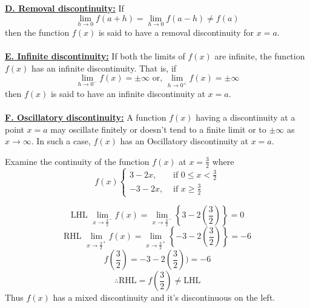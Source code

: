 \underline{\textbf{D. Removal discontinuity:}}
If \[
    \lim_{h \to 0} f(a+h) = \lim_{h \to 0} f(a-h) \neq f(a)
\] then the function $f(x)$ is said to have a removal discontinuity for $x=a$. \\~\\

\underline{\textbf{E. Infinite discontinuity:}}
If both the limits of $f(x)$ are infinite, the function $f(x)$ has an infinite discontinuity. That is, if \[
    \lim_{h \to 0^-} f(x) = \pm \infty \text{ or, } \lim_{h \to 0^+} f(x) = \pm \infty
\] then $f(x)$ is said to have an infinite discontinuity at $x=a$. \\~\\

\underline{\textbf{F. Oscillatory discontinuity:}}
A function $f(x)$ having a discontinuity at a point $x=a$ may oscillate finitely or doesn't tend to a finite limit or to $\pm \infty$ as $x \to \infty$. In such a case, $f(x)$ has an Oscillatory discontinuity at $x=a$.

\begin{example}{Examine the continuity of the function $f(x)$ at $x=\frac{3}{2}$ where 
    \begin{equation*}
        f(x)
        \begin{cases}
            3-2x, &\text{ if } 0 \le x < \frac{3}{2} \\
            -3-2x, & \text{ if } x \ge \frac{3}{2}
        \end{cases}
    \end{equation*}
    }
    
    \[ \text{LHL } \lim_{x \to \frac{3}{2}^-} f(x) = \lim_{x \to \frac{3}{2}^-} \left\{ 3-2 \left( \frac{3}{2} \right) \right\} = 0 \]
    \[ \text{RHL } \lim_{x \to \frac{3}{2}^+} f(x) = \lim_{x \to \frac{3}{2}^+} \left\{ -3-2 \left( \frac{3}{2} \right) \right\} = -6 \]
    \[ f \left( \frac{3}{2} \right) = -3-2 \left( \frac{3}{2} \right)) = -6 \]
    \[ \therefore \text{RHL} = f\left(\frac{3}{2}\right) \neq \text{LHL} \]
    Thus $f(x)$ has a mixed discontinuity and it's discontinuous on the left.
\end{example}
